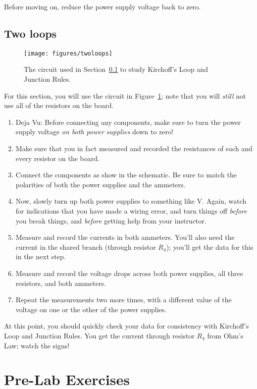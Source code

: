 \documentclass[12pt]{article}
\begin{document}
Before moving on, reduce the power supply voltage back to zero.

\subsection{Two loops}
\label{sec:twoloops}

\begin{figure}
  \centering
  \texttt{[image: figures/twoloops]}
  \caption{The circuit used in Section~\ref{sec:twoloops} to study
    Kirchoff's Loop and Junction Rules.} 
  \label{fig:twoloops}
\end{figure}

For this section, you will use the circuit in
Figure~\ref{fig:twoloops}; note that you will \textit{still} not use
all of the resistors on the board.
\begin{enumerate}
\item Deja Vu: Before connecting any components, make sure to turn the
  power supply voltage \textit{on both power supplies} down to zero!
\item Make sure that you in fact measured and recorded the resistances
  of each and every resistor on the board.
\item Connect the components as show in the schematic.  Be sure to
  match the polarities of both the power supplies and the ammeters.
\item Now, slowly turn up both power supplies to something like
  \unit[15]{V}.  Again, watch for indications that you have made a
  wiring error, and turn things off \textit{before} you break things,
  and \textit{before} getting help from your instructor.
\item Measure and record the currents in both ammeters.  You'll also
  need the current in the shared branch (through resistor $R_4$);
  you'll get the data for this in the next step.
\item Measure and record the voltage drops across both power supplies,
  all three resistors, and both ammeters.
\item Repeat the measurements two more times, with a different value
  of the voltage on one or the other of the power supplies.
\end{enumerate}
At this point, you should quickly check your data for consistency with
Kirchoff's Loop and Junction Rules.  You get the current through
resistor $R_4$ from Ohm's Law; watch the signs!

\newpage
\section*{Pre-Lab Exercises}
\end{document}
